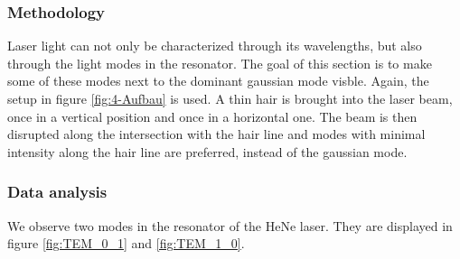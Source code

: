 \documentclass[../main.tex]{subfiles}
\begin{document}
\subsubsection*{Methodology}
    Laser light can not only be characterized through its wavelengths, but also through the light modes in the resonator. The goal of this section is to make some of these modes next to the dominant gaussian mode visble. Again, the setup in figure \ref{fig:4-Aufbau} is used. A thin hair is brought into the laser beam, once in a vertical position and once in a horizontal one. The beam is then disrupted along the intersection with the hair line and modes with minimal intensity along the hair line are preferred, instead of the gaussian mode.

\subsubsection*{Data analysis}
    We observe two modes in the resonator of the HeNe laser. They are displayed in figure \ref{fig:TEM_0_1} and \ref{fig:TEM_1_0}.
\end{document}
